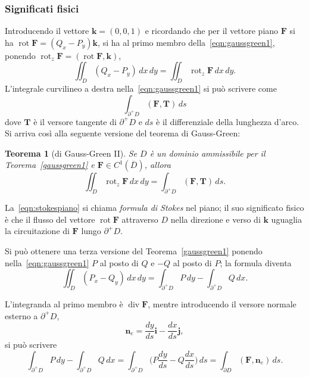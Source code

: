 \documentclass[a4paper]{book}
\DeclareMathOperator{\rot}{rot}
\DeclareMathOperator{\divg}{div}
\numberwithin{equation}{section}
\theoremstyle{plain}
\newtheorem{teor}{Teorema}[section]
\theoremstyle{definition}
\theoremstyle{remark}
\renewcommand{\vec}{\boldsymbol}
\theoremstyle{example}
\begin{document}
	\subsubsection*{Significati fisici}
	Introducendo il vettore $\vec{k} = (0, 0, 1)$ e ricordando che per il vettore piano $\vec{F}$ si ha $\rot \vec{F} = (Q_x - P_y) \vec{k}$, si ha al primo membro della~\eqref{eqn:gaussgreen1}, ponendo $\rot_z \vec{F} = (\rot \vec{F}, \vec{k})$,
	\begin{equation}
		\iint_D (Q_x - P_y)\,dx \,dy = \iint_D \rot_z \vec{F} \,dx \, dy.
	\end{equation}
	L'integrale curvilineo a destra nella~\eqref{eqn:gaussgreen1} si può scrivere come
	\begin{equation*}
		\int_{\partial^+D} (\vec{F}, \vec{T}) \, ds
	\end{equation*}
	dove $\vec{T}$ è il versore tangente di $\partial^+ D$ e $ds$ è il differenziale della lunghezza d'arco. Si arriva così alla seguente versione del teorema di Gauss-Green:
	\begin{teor}[di Gauss-Green II]
		Se $D$ è un dominio ammissibile per il Teorema~\ref{gaussgreen1} e $\vec{F} \in C^1(\overline{D})$, allora
		\begin{equation}
			\label{eqn:stokespiano}
			\iint_D \rot_z \vec{F} \, dx \, dy = \int_{\partial^+D} (\vec{F}, \vec{T}) \, ds.
		\end{equation}
	\end{teor}

	La~\eqref{eqn:stokespiano} si chiama \emph{formula di Stokes} nel piano; il suo significato fisico è che il flusso del vettore $\rot\vec{F}$ attraverso $D$ nella direzione e verso di $\vec{k}$ uguaglia la circuitazione di $\vec{F}$ lungo $\partial^+D$.

	Si può ottenere una terza versione del Teorema~\ref{gaussgreen1} ponendo nella~\eqref{eqn:gaussgreen1} $P$ al posto di $Q$ e $-Q$ al posto di $P$; la formula diventa
	\begin{equation}
		\iint_D (P_x - Q_y) \, dx \, dy = \int_{\partial^+ D} P \, dy - \int_{\partial^+ D} Q \, dx.
	\end{equation}

	L'integranda al primo membro è $\divg \vec{F}$, mentre introducendo il versore normale esterno a $\partial^+ D$,
	\begin{equation*}
		\vec{n}_e = \frac{dy}{ds}\vec{i} - \frac{dx}{ds}\vec{j},
	\end{equation*}
	si può scrivere
	\begin{equation*}
		\int_{\partial ^+ D}P \, dy - \int_{\partial^+D}Q \, dx = \int_{\partial^+D}\biggl( P\frac{dy}{ds} - Q\frac{dx}{ds} \biggr) \, ds = \int_{\partial D}(\vec{F}, \vec{n}_e)\, ds.
	\end{equation*}
\end{document}
